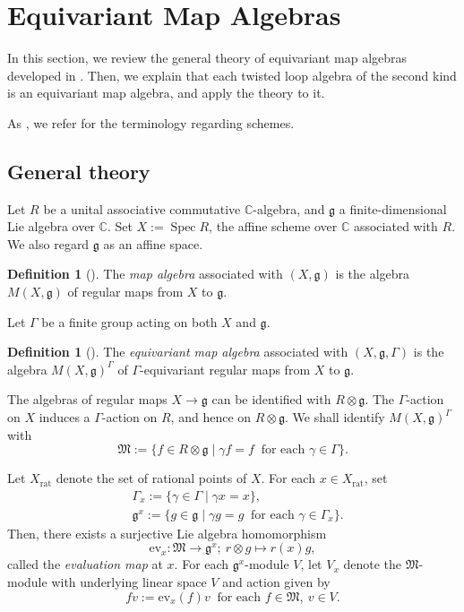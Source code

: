 \documentclass[12pt,a4paper]{amsart}
\theoremstyle{definition}
\newtheorem{defi}[thm]{Definition}
\numberwithin{equation}{subsection}
\begin{document}
\section{Equivariant Map Algebras}\label{sect: ema}
In this section, we review the general theory of equivariant map algebras developed in \cite{NSS12}.
Then, we explain that each twisted loop algebra of the second kind is an equivariant map algebra, and apply the theory to it.

As \cite{NSS12}, we refer \cite{EiHa00} for the terminology regarding schemes.

\subsection{General theory}
Let $R$ be a unital associative commutative $\mathbb{C}$-algebra, and $\mathfrak{g}$ a finite-dimensional Lie algebra over $\mathbb{C}$.
Set $X := \operatorname{Spec} R$, the affine scheme over $\mathbb{C}$ associated with $R$.
We also regard $\mathfrak{g}$ as an affine space.

\begin{defi}[{\cite[Definition 2.1]{NSS12}}]
  The \emph{map algebra} associated with $(X,\mathfrak{g})$ is the algebra $M(X,\mathfrak{g})$ of regular maps from $X$ to $\mathfrak{g}$.
\end{defi}

Let $\Gamma$ be a finite group acting on both $X$ and $\mathfrak{g}$.

\begin{defi}[{\cite[Definition 3.1]{NSS12}}]
  The \emph{equivariant map algebra} associated with $(X,\mathfrak{g},\Gamma)$ is the algebra $M(X,\mathfrak{g})^\Gamma$ of $\Gamma$-equivariant regular maps from $X$ to $\mathfrak{g}$.
\end{defi}
  
The algebras of regular maps $X \to \mathfrak{g}$ can be identified with $R \otimes \mathfrak{g}$.
The $\Gamma$-action on $X$ induces a $\Gamma$-action on $R$, and hence on $R \otimes \mathfrak{g}$.
We shall identify $M(X,\mathfrak{g})^\Gamma$ with
\[
  \mathfrak{M} := \{ f \in R \otimes \mathfrak{g} \mid \gamma f = f \ \text{ for each } \gamma \in \Gamma \}.
\]

Let $X_\mathrm{rat}$ denote the set of rational points of $X$.
For each $x \in X_\mathrm{rat}$, set
\begin{align*}
  &\Gamma_x := \{ \gamma \in \Gamma \mid \gamma x = x \}, \\
  &\mathfrak{g}^x := \{ g \in \mathfrak{g} \mid \gamma g = g \ \text{ for each } \gamma \in \Gamma_x \}.
\end{align*}
Then, there exists a surjective Lie algebra homomorphism
\[
  \mathrm{ev}_x : \mathfrak{M} \to \mathfrak{g}^x; \ r \otimes g \mapsto r(x) g,
\]
called the \emph{evaluation map} at $x$.
For each $\mathfrak{g}^x$-module $V$, let $V_x$ denote the $\mathfrak{M}$-module with underlying linear space $V$ and action given by
\[
  f v := \mathrm{ev}_x(f) v \ \text{ for each } f \in \mathfrak{M}, \ v \in V.
\]
\end{document}
